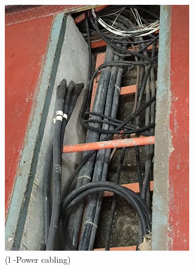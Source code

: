 \begin{figure}
\begin{minipage}[b]{0.22\linewidth}
	\includegraphics[width=\textwidth]{figures/asv_visualpowercables}
	\caption*{(l -Power cabling)}
\end{minipage}
	\hspace{0.03cm}
\begin{minipage}[b]{0.22\linewidth}

\end{minipage}
\end{figure}
